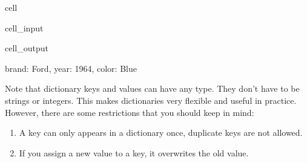 \documentclass[letterpaper,10pt,english]{jupyterBook}
\begin{document}
\begin{sphinxuseclass}{cell}\begin{sphinxVerbatimInput}

\begin{sphinxuseclass}{cell_input}
\begin{sphinxVerbatim}[commandchars=\\\{\}]
 \PYG{p}{[}\PYG{p}{]}
\end{sphinxVerbatim}

\end{sphinxuseclass}\end{sphinxVerbatimInput}
\begin{sphinxVerbatimOutput}

\begin{sphinxuseclass}{cell_output}
\begin{sphinxVerbatim}[commandchars=\\\{\}]
\PYGZob{}\PYGZsq{}brand\PYGZsq{}: \PYGZsq{}Ford\PYGZsq{}, \PYGZsq{}year\PYGZsq{}: 1964, \PYGZsq{}color\PYGZsq{}: \PYGZsq{}Blue\PYGZsq{}\PYGZcb{}
\end{sphinxVerbatim}

\end{sphinxuseclass}\end{sphinxVerbatimOutput}

\end{sphinxuseclass}
\sphinxAtStartPar
Note that dictionary keys and values can have any type. They don’t have to be strings or integers. This makes dictionaries very flexible and useful in practice. However, there are some restrictions that you should keep in mind:
\begin{enumerate}
%
\item {} 
\sphinxAtStartPar
A key can only appears in a dictionary once, duplicate keys are not allowed.

\item {} 
\sphinxAtStartPar
If you assign a new value to a key, it overwrites the old value.

\end{enumerate}
\end{document}
